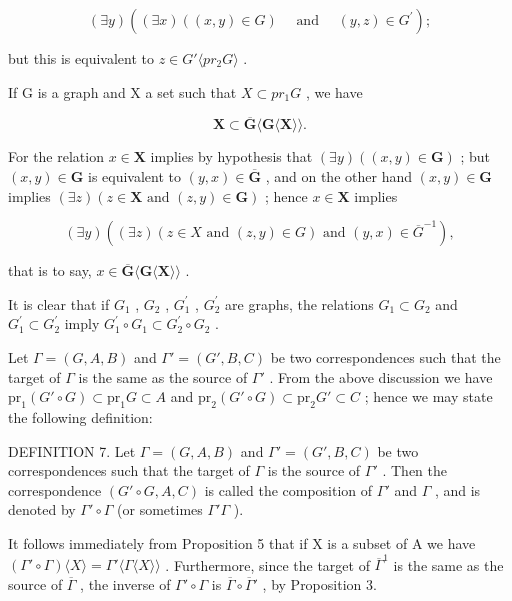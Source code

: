 \[
(\exists y) ((\exists x) ((x, y) \in G) \quad \text { and } \quad (y, z) \in G ^ {\prime});
\]

but this is equivalent to \(z \in G' \langle pr_{2}G \rangle\) .

If G is a graph and X a set such that \(X \subset pr_{1}G\) , we have

\[
\mathbf {X} \subset \overline {{\mathbf {G}}} \langle \mathbf {G} \langle \mathbf {X} \rangle \rangle .
\]

For the relation \(x \in \mathbf{X}\) implies by hypothesis that \((\exists y)((x, y) \in \mathbf{G})\) ; but \((x, y) \in \mathbf{G}\) is equivalent to \((y, x) \in \overline{\mathbf{G}}\) , and on the other hand \((x, y) \in \mathbf{G}\) implies \((\exists z)(z \in \mathbf{X} \text{ and } (z, y) \in \mathbf{G})\) ; hence \(x \in \mathbf{X}\) implies

\[
(\exists y) ((\exists z) (z \in X \text { and } (z, y) \in G) \text { and } (y, x) \in \overline {{G}} ^ {- 1}),
\]

that is to say, \(x \in \overline{\mathbf{G}}\langle \mathbf{G}\langle \mathbf{X}\rangle\rangle\) .

It is clear that if \(G_{1}\) , \(G_{2}\) , \(G_{1}^{\prime}\) , \(G_{2}^{\prime}\) are graphs, the relations \(G_{1} \subset G_{2}\) and \(G_{1}^{\prime} \subset G_{2}^{\prime}\) imply \(G_{1}^{\prime} \circ G_{1} \subset G_{2}^{\prime} \circ G_{2}\) .

Let \(\Gamma = (G, A, B)\) and \(\Gamma' = (G', B, C)\) be two correspondences such that the target of \(\Gamma\) is the same as the source of \(\Gamma'\) . From the above discussion we have \(\mathrm{pr}_1(G' \circ G) \subset \mathrm{pr}_1G \subset A\) and \(\mathrm{pr}_2(G' \circ G) \subset \mathrm{pr}_2G' \subset C\) ; hence we may state the following definition:

DEFINITION 7. Let \(\Gamma = (G, A, B)\) and \(\Gamma' = (G', B, C)\) be two correspondences such that the target of \(\Gamma\) is the source of \(\Gamma'\) . Then the correspondence \((G' \circ G, A, C)\) is called the composition of \(\Gamma'\) and \(\Gamma\) , and is denoted by \(\Gamma' \circ \Gamma\) (or sometimes \(\Gamma' \Gamma\) ).

It follows immediately from Proposition 5 that if X is a subset of A we have \((\Gamma'\circ\Gamma)\langle X\rangle=\Gamma'\langle\Gamma\langle X\rangle\rangle\) . Furthermore, since the target of \(\overline{\Gamma}^{1}\) is the same as the source of \(\overline{\Gamma}\) , the inverse of \(\Gamma'\circ\Gamma\) is \(\overline{\Gamma}\circ\overline{\Gamma}'\) , by Proposition 3.

